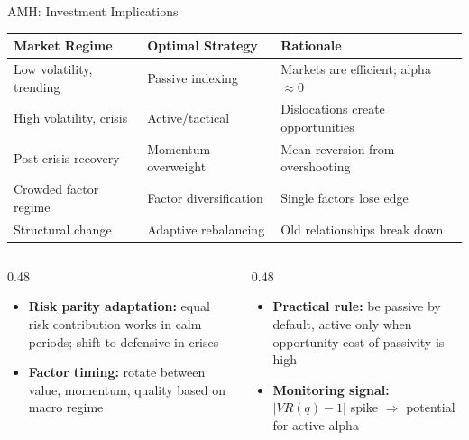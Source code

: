 \documentclass[9pt, aspectratio=169, t]{beamer}
\theoremstyle{definition}
\newenvironment{cminipage}[1]{%
    \par\noindent\hfill\begin{minipage}{#1}\ignorespaces
}{%
    \end{minipage}\hfill\null\par
}
\begin{document}
\begin{frame}{AMH: Investment Implications}
\begin{cminipage}{0.95\textwidth}
\small
\renewcommand{\arraystretch}{1.2}
\begin{center}
\footnotesize
\begin{tabular}{lll}
\toprule
\textbf{Market Regime} & \textbf{Optimal Strategy} & \textbf{Rationale} \\
\midrule
Low volatility, trending & Passive indexing & Markets are efficient; alpha $\approx 0$ \\
High volatility, crisis & Active/tactical & Dislocations create opportunities \\
Post-crisis recovery & Momentum overweight & Mean reversion from overshooting \\
Crowded factor regime & Factor diversification & Single factors lose edge \\
Structural change & Adaptive rebalancing & Old relationships break down \\
\bottomrule
\end{tabular}
\end{center}

\vspace{0.2cm}
\begin{columns}[T]
\begin{column}{0.48\textwidth}
\begin{itemize}\setlength{\itemsep}{0pt}
    \item \textbf{Risk parity adaptation:} equal risk contribution works in calm periods; shift to defensive in crises
    \item \textbf{Factor timing:} rotate between value, momentum, quality based on macro regime
\end{itemize}
\end{column}
\begin{column}{0.48\textwidth}
\begin{itemize}\setlength{\itemsep}{0pt}
    \item \textbf{Practical rule:} be passive by default, active only when opportunity cost of passivity is high
    \item \textbf{Monitoring signal:} $|VR(q) - 1|$ spike $\Rightarrow$ potential for active alpha
\end{itemize}
\end{column}
\end{columns}
\end{cminipage}
\end{frame}
\end{document}

